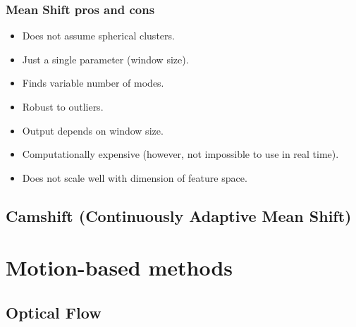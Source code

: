 \documentclass[a4paper]{article}
\begin{document}
\subsubsection{Mean Shift pros and cons}
\begin{multicols}{2}
    \begin{itemize}
        \item[\textcolor{DarkPink}{\ding{51}}] Does not assume spherical clusters.
        \item[\textcolor{DarkPink}{\ding{51}}] Just a single parameter (window size).
        \item[\textcolor{DarkPink}{\ding{51}}]
        Finds variable number of modes.
        \item[\textcolor{DarkPink}{\ding{51}}]
        Robust to outliers.
    \end{itemize}
    
    \columnbreak
    \begin{itemize}
        \item[\textcolor{DarkPink}{\ding{55}}] 
        Output depends on window size.
        \item[\textcolor{DarkPink}{\ding{55}}]
        Computationally expensive (however, not impossible to use in real time).
        \item[\textcolor{DarkPink}{\ding{55}}]
        Does not scale well with dimension of feature space.
    \end{itemize}
\end{multicols}




\subsection{Camshift (Continuously Adaptive Mean Shift)}






\section{Motion-based methods}

\subsection{Optical Flow}
\end{document}
